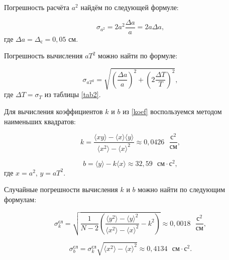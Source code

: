 \documentclass[a4paper,12pt]{article} %
\begin{document}


Погрешность расчёта $ a^2 $ найдём по следующей формуле:

\begin{equation}
\sigma_{a^2}=2a^2\frac{\Delta a}{a}=2a\Delta a,
\end{equation}
где $ \Delta a = \Delta_\text{с} = 0,05$ см.

Погрешность вычисления $ aT^2 $ можно найти по формуле:

\begin{equation}
\sigma_{aT^2} = \sqrt{\left(  \frac{\Delta a}{a} \right)^2 + \left( 2\frac{\Delta T}{T} \right)^2 },
\end{equation}
где $ \Delta T = \sigma_T $ из таблицы \ref{tab2}.

Для вычисления коэффициентов $ k $ и $ b $ из \eqref{koef} воспользуемся методом наименьших квадратов:

\begin{equation}
k=\frac{\langle xy\rangle-\langle x\rangle \langle y\rangle}{\langle x^2\rangle - \langle x\rangle^2}\approx 0,0426\text{ }\frac{\text{с}^2}{\text{см}},
\end{equation}

\begin{equation}
b=\langle y \rangle -k\langle x \rangle\approx 32,59\text{ }\text{см}\cdot\text{с}^2,
\end{equation}
где $ x=a^2 $, $ y=aT^2 $.

Случайные погрешности вычисления $ k $ и $ b $ можно найти по следующим формулам:

\begin{equation}
\sigma_k^\text{сл}=\sqrt{\frac{1}{N-2}\left(\frac{\langle y^2 \rangle - \langle y \rangle^2}{\langle x^2 \rangle - \langle x \rangle^2} - k^2 \right) } \approx 0,0018 \text{ }\frac{\text{с}^2}{\text{см}},
\end{equation}

\begin{equation}
\sigma_b^\text{сл}= \sigma_k^\text{сл} \sqrt{\langle x^2 \rangle - \langle x \rangle^2} \approx 0,4134 \text{ }\text{см}\cdot\text{с}^2.
\end{equation}
\end{document}
